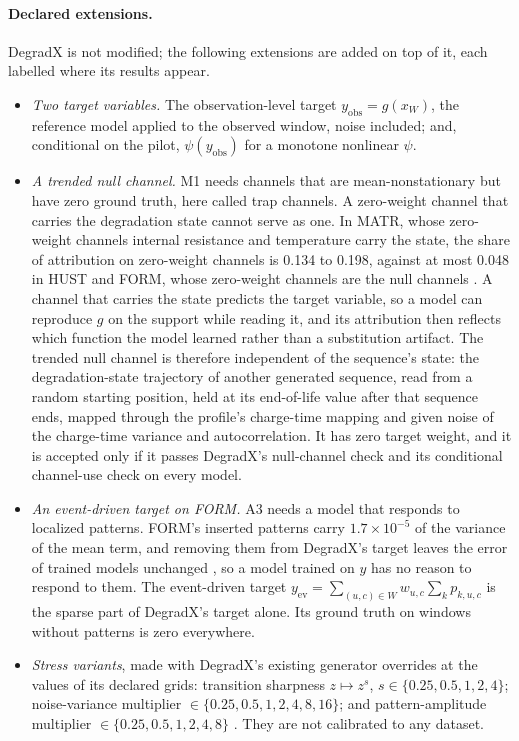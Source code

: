 \documentclass{article}
\begin{document}
\paragraph{Declared extensions.} DegradX is not modified; the following extensions are added on top of it, each labelled where its results appear.
\begin{itemize}
\item \emph{Two target variables.} The observation-level target $y_{\mathrm{obs}} = g(x_W)$, the reference model applied to the observed window, noise included; and, conditional on the pilot, $\psi(y_{\mathrm{obs}})$ for a monotone nonlinear $\psi$.
\item \emph{A trended null channel.} M1 needs channels that are mean-nonstationary but have zero ground truth, here called trap channels. A zero-weight channel that carries the degradation state cannot serve as one. In MATR, whose zero-weight channels internal resistance and temperature carry the state, the share of attribution on zero-weight channels is 0.134 to 0.198, against at most 0.048 in HUST and FORM, whose zero-weight channels are the null channels \citep{degradx2026}. A channel that carries the state predicts the target variable, so a model can reproduce $g$ on the support while reading it, and its attribution then reflects which function the model learned rather than a substitution artifact. The trended null channel is therefore independent of the sequence's state: the degradation-state trajectory of another generated sequence, read from a random starting position, held at its end-of-life value after that sequence ends, mapped through the profile's charge-time mapping and given noise of the charge-time variance and autocorrelation. It has zero target weight, and it is accepted only if it passes DegradX's null-channel check and its conditional channel-use check on every model.
\item \emph{An event-driven target on FORM.} A3 needs a model that responds to localized patterns. FORM's inserted patterns carry $1.7\times10^{-5}$ of the variance of the mean term, and removing them from DegradX's target leaves the error of trained models unchanged \citep{degradx2026}, so a model trained on $y$ has no reason to respond to them. The event-driven target $y_{\mathrm{ev}} = \sum_{(u,c)\in W} w_{u,c}\sum_k p_{k,u,c}$ is the sparse part of DegradX's target alone. Its ground truth on windows without patterns is zero everywhere.
\item \emph{Stress variants}, made with DegradX's existing generator overrides at the values of its declared grids: transition sharpness $z\mapsto z^s$, $s\in\{0.25,0.5,1,2,4\}$; noise-variance multiplier $\in\{0.25,0.5,1,2,4,8,16\}$; and pattern-amplitude multiplier $\in\{0.25,0.5,1,2,4,8\}$ \citep{degradxrepo}. They are not calibrated to any dataset.

\end{itemize}
\end{document}

